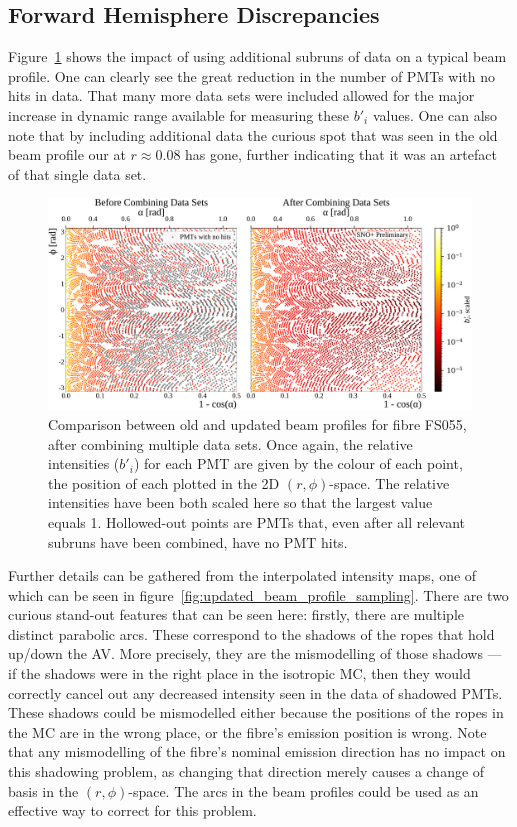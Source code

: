 \subsection{Forward Hemisphere Discrepancies}\label{sec:smellie_systematics_forward}
Figure~\ref{fig:updated_beam_profile} shows the impact of using additional subruns of data on a typical beam profile. One can clearly see the great reduction in the number of PMTs with no hits in data. That many more data sets were included allowed for the major increase in dynamic range available for measuring these $b'_{i}$ values. One can also note that by including additional data the curious spot that was seen in the old beam profile our at $r\approx0.08$ has gone, further indicating that it was an artefact of that single data set.
\begin{figure}
    \centering
    \includegraphics[width=\textwidth]{4_SMELLIESimulation/images/flat_plot_r_comparison_FS055_old_vs_new_empty_circles.pdf}
    \caption[Comparison between old and updated beam profiles for fibre FS055, after combining multiple data sets]{Comparison between old and updated beam profiles for fibre FS055, after combining multiple data sets. Once again, the relative intensities ($b'_{i}$) for each PMT are given by the colour of each point, the position of each plotted in the 2D $(r,\phi)$-space. The relative intensities have been both scaled here so that the largest value equals 1. Hollowed-out points are PMTs that, even after all relevant subruns have been combined, have no PMT hits.}
    \label{fig:updated_beam_profile}
\end{figure}

Further details can be gathered from the interpolated intensity maps, one of which can be seen in figure~\ref{fig:updated_beam_profile_sampling}. There are two curious stand-out features that can be seen here: firstly, there are multiple distinct parabolic arcs. These correspond to the shadows of the ropes that hold up/down the AV. More precisely, they are the mismodelling of those shadows --- if the shadows were in the right place in the isotropic MC, then they would correctly cancel out any decreased intensity seen in the data of shadowed PMTs. These shadows could be mismodelled either because the positions of the ropes in the MC are in the wrong place, or the fibre's emission position is wrong. Note that any mismodelling of the fibre's nominal emission direction has no impact on this shadowing problem, as changing that direction merely causes a change of basis in the $(r,\phi)$-space. The arcs in the beam profiles could be used as an effective way to correct for this problem.

